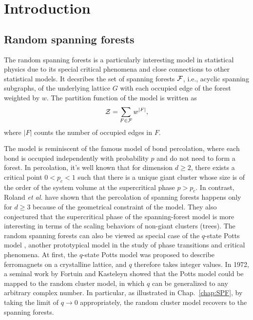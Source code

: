 \chapter{Introduction}\label{chap:intro}

\section{Random spanning forests}
The random spanning forests is a particularly interesting model in statistical physics due to its special critical phenomena
and close connections to other statistical models. It decsribes the set of spanning forests ${\mathcal F}$, i.e., acyclic spanning subgraphs, of the underlying
lattice $G$ with each occupied edge of the forest weighted by $w$. The partition function of the model is written as
\begin{equation}\label{eq:SPF_partition}
	{\mathcal Z} = \sum_{F \in {\mathcal F}} w^{|F|},
\end{equation}
where $|F|$ counts the number of occupied edges in $F$.

The model is reminiscent of the famous model of bond percolation, where each bond is occupied independently with probability $p$ and do not need to form a forest.
In percolation, it's well known that for dimension $d \geq 2$, there exists a critical point $0 < p_c < 1$ such that there is a unique giant cluster whose size is of the order of the system volume
at the supercritical phase $p > p_c$. In contrast, Roland \textit{et al.} \cite{Roland2021Percolation} have shown that the percolation of spanning forests happens only for $d \geq 3$ 
because of the geometrical constraint of the model. They also conjectured that the supercritical phase of the spanning-forest model is more interesting in terms of the scaling behaviors of non-giant clusters (trees). 
The random spanning forests can also be viewed as special case of the $q$-state Potts model \cite{Potts1952, Wu1982}, another prototypical model in the study of phase transitions and critical phenomena.
At first, the $q$-state Potts model was proposed to describe ferromagnets on a crystalline lattice, and $q$ therefore takes integer values.
In 1972, a seminal work by Fortuin and Kasteleyn \cite{Fortuin1972} showed that the Potts model could be mapped to the random cluster model, in which $q$ can be 
generalized to any arbitrary complex number. In particular, as illustrated in Chap.~\ref{chap:SPF}, by taking the limit of $q\to 0$ appropriately,
the random cluster model recovers to the spanning forests.

